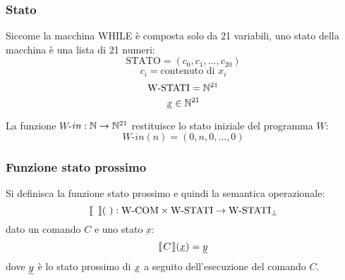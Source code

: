 \subsubsection*{Stato}
Siccome la macchina WHILE è composta solo da 21 variabili, uno stato della macchina è
una lista di 21 numeri:
$$ \text{STATO} = (c_0,c_1,\dots,c_{20}) $$
$$ c_i = \text{contenuto di $x_i$} $$
$$ \text{W-STATI} = \mathbb{N}^{21} $$
$$ \underbar{$x$}\in\mathbb{N}^{21} $$

La funzione $W$-$in:\mathbb{N}\to\mathbb{N}^{21}$ restituisce lo stato iniziale del programma $W$:
$$ W\text{-}in(n) = (0,n,0,\dots,0) $$

\subsubsection*{Funzione stato prossimo}
Si definisca la funzione stato prossimo e quindi la semantica operazionale:
$$\opsemWHILE{\ }{\ }: \text{W-COM}\times\text{W-STATI}\to\text{W-STATI}_\perp$$
dato un comando $C$ e uno stato $\underbar{x}$:
$$ \opsemWHILE{C}{\sottolinea{x}} = \sottolinea{y} $$
dove $\text{\underline{$y$}}$ è lo stato prossimo di $\text{\underline{$x$}}$ a seguito dell'esecuzione del
comando $C$.

